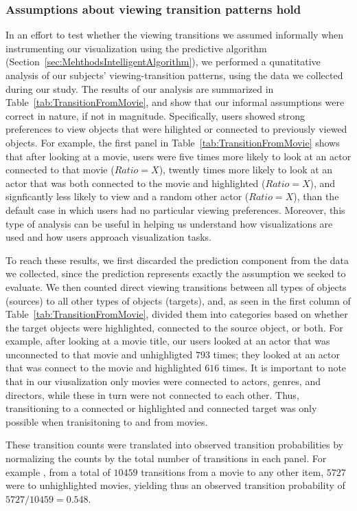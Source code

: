 \subsubsection{Assumptions about viewing transition patterns hold}
\label{sec:EvalAssumptionAboutViewingTransition}
In an effort to test whether the viewing transitions we assumed informally when instrumenting our visualization using the predictive algorithm (Section~\ref{sec:MehthodsIntelligentAlgorithm}), we performed a qunatitative analysis of our subjects’ viewing-transition patterns, using the data we collected during our study. The results of our analysis are summarized in Table~\ref{tab:TransitionFromMovie}, and show that our informal assumptions were correct in nature, if not in magnitude. Specifically, users showed strong preferences to view objects that were hilighted or connected to previously viewed objects. For example, the first panel in Table~\ref{tab:TransitionFromMovie} shows that after looking at a movie, users were five times more likely to look at an actor connected to that movie ($Ratio = X$), twently times more likely to look at an actor that was both connected to the movie and highlighted ($Ratio = X$), and signficantly less likely to view and a random other actor ($Ratio = X$), than the default case in which users had no particular viewing preferences.   Moreover, this type of analysis can be useful in helping us understand how visualizations are used and how users approach visualization tasks.


To reach these results, we first discarded the prediction component from the data we collected, since the prediction represents exactly the assumption we seeked to evaluate. We then counted direct viewing transitions between all types of objects (sources) to all other types of objects (targets), and, as seen in the first column of Table~\ref{tab:TransitionFromMovie}, divided them into categories based on whether the target objects were highlighted, connected to the source object, or both.  For example, after looking at a movie title, our users looked at an actor that was unconnected to that movie and unhighligted $793$ times; they looked at an actor that was connect to the movie and highlighted $616$ times. It is important to note that in our viusalization only movies were connected to actors, genres, and directors, while these in turn were not connected to each other. Thus, transitioning to a connected or highlighted and connected target was only possible when tranisitoning to and from movies.
    

These transition counts were translated into observed transition probabilities by normalizing the counts by the total number of transitions in each panel. For example , from a total of $10459$ transitions from a movie to any other item, $5727$ were to unhighlighted movies, yielding thus an observed transition probability of $5727 / 10459 = 0.548$.

